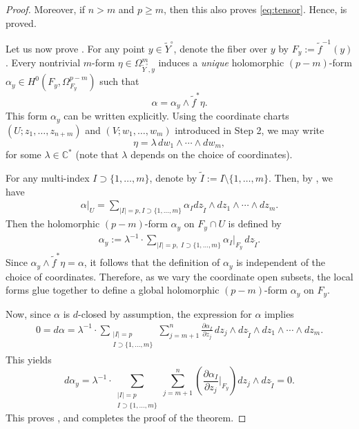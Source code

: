 \documentclass[11pt,a4paper,english]{smfart}
\theoremstyle{plain}
\theoremstyle{definition}
\theoremstyle{plain}
\begin{document}
\begin{proof}
	Moreover, if \( n > m \) and \( p \geq m \), then this also proves \eqref{eq:tensor}. Hence,  is proved.
	
	
 
 \medspace
 
 Let us now prove .  
 For any point \( y \in \widetilde{Y}^\circ \), denote the fiber over \( y \) by \( F_y := \tilde{f}^{-1}(y) \).  
 Every nontrivial \( m \)-form \( \eta \in \Omega^m_{\widetilde{Y}^\circ,y} \) induces a \emph{unique} holomorphic \((p - m)\)-form \( \alpha_y \in H^0(F_y, \Omega^{p-m}_{F_y}) \) such that
 \[
 \alpha = \alpha_y \wedge \tilde{f}^*\eta.
 \]
 This form \( \alpha_y \) can be written explicitly. Using the coordinate charts \( (U; z_1, \ldots, z_{n+m}) \) and \( (V; w_1, \ldots, w_m) \) introduced in Step 2, we may write
 \[
 \eta = \lambda \, dw_1 \wedge \cdots \wedge dw_m,
 \]
 for some \( \lambda \in \mathbb{C}^* \) (note that \( \lambda \) depends on the choice of coordinates).
 
 For any multi-index \( I \supset \{1, \ldots, m\} \), denote by \( \tilde{I} := I \setminus \{1, \ldots, m\} \).  
 Then, by , we have  
\begin{align}\label{eq:express2}
	 \alpha|_U=\sum_{|I|=p,I\supset\{1,\ldots,m\}}\alpha_Idz_{\tilde{I}}\wedge dz_1\wedge \cdots\wedge dz_m.
\end{align} 
Then the holomorphic \((p - m)\)-form \( \alpha_y \) on \( F_y \cap U \) is defined by
\begin{align}\label{eq:express}
	\alpha_y := \lambda^{-1} \cdot \sum_{|I| = p,\; I \supset \{1, \ldots, m\}} \alpha_I|_{F_y} \, dz_{\tilde{I}}.
\end{align}
Since \( \alpha_y \wedge \tilde{f}^*\eta = \alpha \), it follows that the definition of \( \alpha_y \) is independent of the choice of coordinates. Therefore, as we vary the coordinate open subsets, the local forms glue together to define a global holomorphic \((p - m)\)-form \( \alpha_y \) on \( F_y \).

Now, since \( \alpha \) is \( d \)-closed by assumption, the expression for \( \alpha \) implies
\begin{align}\label{eq:together}
	0 = d\alpha = \lambda^{-1} \cdot \sum_{\substack{|I| = p\\ I \supset \{1, \ldots, m\}}} \sum_{j = m + 1}^{n} \frac{\partial \alpha_I}{\partial z_j} \, dz_j \wedge dz_{\tilde{I}} \wedge dz_1 \wedge \cdots \wedge dz_m.
\end{align}
This yields
\[
d\alpha_y = \lambda^{-1} \cdot \sum_{\substack{|I| = p\\ I \supset \{1, \ldots, m\}}} \sum_{j = m + 1}^{n} \left( \frac{\partial \alpha_I}{\partial z_j} \bigg|_{F_y} \right) dz_j \wedge dz_{\tilde{I}} = 0.
\]
This proves , and completes the proof of the theorem. 
	\end{proof}
	
\end{document}
